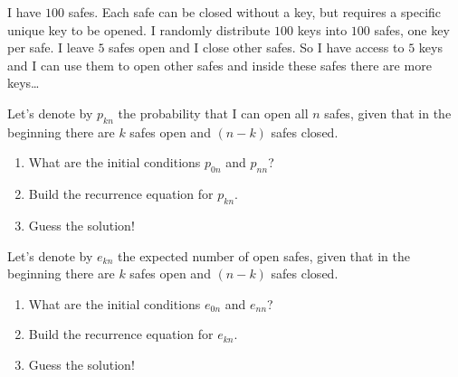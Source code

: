 \documentclass[12pt]{article}
\begin{document}
\begin{exercise}
I have $100$ safes. Each safe can be closed without a key, but requires a specific unique key to be opened. 
I randomly distribute $100$ keys into $100$ safes, one key per safe. 
I leave $5$ safes open and I close other safes. So I have access to $5$ keys and I can use them to open other safes and inside these safes there are more keys\dots{ }

Let's denote by $p_{kn}$ the probability that I can open all $n$ safes, given that in the beginning there are $k$ safes open and $(n-k)$ safes closed.
\begin{enumerate}[label=\alph*)]
    \item What are the initial conditions $p_{0n}$ and $p_{nn}$?
    \item Build the recurrence equation for $p_{kn}$.
    \item Guess the solution!
\end{enumerate}
Let's denote by $e_{kn}$ the expected number of open safes, given that in the beginning there are $k$ safes open and $(n-k)$ safes closed.
\begin{enumerate}[resume]
    \item What are the initial conditions $e_{0n}$ and $e_{nn}$?
    \item Build the recurrence equation for $e_{kn}$.
    \item Guess the solution!
\end{enumerate}


\end{exercise}
\end{document}
